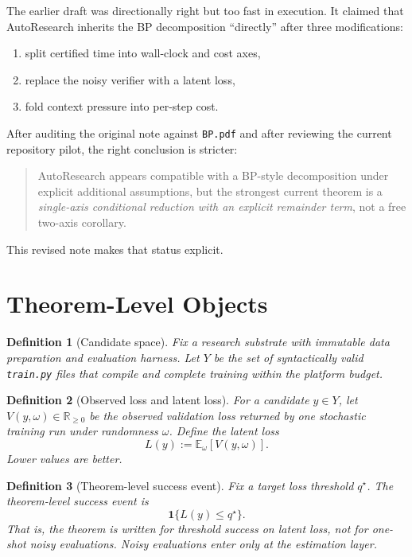 \documentclass[11pt]{article}
\newtheorem{definition}{Definition}
\begin{document}
The earlier draft was directionally right but too fast in execution. It claimed that AutoResearch
inherits the BP decomposition ``directly'' after three modifications:

\begin{enumerate}
\item split certified time into wall-clock and cost axes,
\item replace the noisy verifier with a latent loss,
\item fold context pressure into per-step cost.
\end{enumerate}

After auditing the original note against \texttt{BP.pdf} and after reviewing the current repository
pilot, the right conclusion is stricter:

\begin{quote}
AutoResearch appears compatible with a BP-style decomposition under explicit additional
assumptions, but the strongest current theorem is a \emph{single-axis conditional reduction with
an explicit remainder term}, not a free two-axis corollary.
\end{quote}

This revised note makes that status explicit.

\section{Theorem-Level Objects}

\begin{definition}[Candidate space]
Fix a research substrate with immutable data preparation and evaluation harness.
Let $Y$ be the set of syntactically valid \texttt{train.py} files that compile and complete training
within the platform budget.
\end{definition}

\begin{definition}[Observed loss and latent loss]
For a candidate $y \in Y$, let $V(y,\omega) \in \mathbb{R}_{\ge 0}$ be the observed validation loss
returned by one stochastic training run under randomness $\omega$.
Define the latent loss
\[
L(y) := \mathbb{E}_\omega[V(y,\omega)].
\]
Lower values are better.
\end{definition}

\begin{definition}[Theorem-level success event]
Fix a target loss threshold $q^\star$.
The theorem-level success event is
\[
\mathbf{1}\{L(y)\le q^\star\}.
\]
That is, the theorem is written for threshold success on \emph{latent} loss, not for one-shot noisy
evaluations. Noisy evaluations enter only at the estimation layer.
\end{definition}
\end{document}
